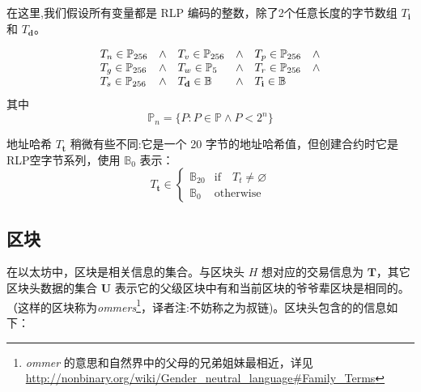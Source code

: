 \documentclass[9pt,oneside]{amsart}
\begin{document}
\begin{multicols}{2}
在这里,我们假设所有变量都是 RLP 编码的整数，除了2个任意长度的字节数组 $T_\mathbf{i}$ 和 $T_\mathbf{d}$。

\begin{equation}
\begin{array}[t]{lclclc}
T_n \in \mathbb{P}_{256} & \wedge & T_v \in \mathbb{P}_{256} & \wedge & T_p \in \mathbb{P}_{256} & \wedge \\
T_g \in \mathbb{P}_{256} & \wedge & T_w \in \mathbb{P}_5 & \wedge & T_r \in \mathbb{P}_{256} & \wedge \\
T_s \in \mathbb{P}_{256} & \wedge & T_\mathbf{d} \in \mathbb{B} & \wedge & T_\mathbf{i} \in \mathbb{B}
\end{array}
\end{equation}
其中
\begin{equation}
\mathbb{P}_n = \{ P: P \in \mathbb{P} \wedge P < 2^n \}
\end{equation}

地址哈希 $T_\mathbf{t}$ 稍微有些不同:它是一个 20 字节的地址哈希值，但创建合约时它是RLP空字节系列，使用 $\mathbb{B}_0$ 表示：
\begin{equation}
T_\mathbf{t} \in \begin{cases} \mathbb{B}_{20} & \text{if} \quad T_t \neq \varnothing \\
\mathbb{B}_{0} & \text{otherwise}\end{cases}
\end{equation}

\subsection{区块} \label{ch:block}

在以太坊中，区块是相关信息的集合。与区块头 $H$ 想对应的交易信息为 $\mathbf{T}$，其它区块头数据的集合 $\mathbf{U}$  表示它的父级区块中有和当前区块的爷爷辈区块是相同的。（这样的区块称为\textit{ommers}\footnote{\textit{ommer} 的意思和自然界中的父母的兄弟姐妹最相近，详见 \url{http://nonbinary.org/wiki/Gender_neutral_language#Family_Terms}}，译者注:不妨称之为叔链)。区块头包含的的信息如下：



\end{multicols}
\end{document}
